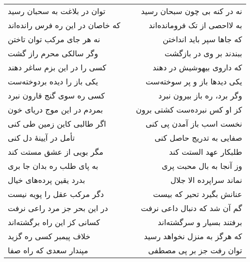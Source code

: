 \begin{center}
\begin{longtable}{l p{0.5cm} r}
\\
توان در بلاغت به سحبان رسید
&&
نه در کنه بی چون سبحان رسید
\\
که خاصان در این ره فرس رانده‌اند
&&
به لااحصی از تک فرومانده‌اند
\\
نه هر جای مرکب توان تاختن
&&
که جاها سپر باید انداختن
\\
وگر سالکی محرم راز گشت
&&
ببندند بر وی در بازگشت
\\
کسی را در این بزم ساغر دهند
&&
که داروی بیهوشیش در دهند
\\
یکی باز را دیده بردوخته‌ست
&&
یکی دیدها باز و پر سوخته‌ست
\\
کسی ره سوی گنج قارون نبرد
&&
وگر برد، ره باز بیرون نبرد
\\
بمردم در این موج دریای خون
&&
کز او کس نبرده‌ست کشتی برون
\\
اگر طالبی کاین زمین طی کنی
&&
نخست اسب باز آمدن پی کنی
\\
تأمل در آیینهٔ دل کنی
&&
صفایی به تدریج حاصل کنی
\\
مگر بویی از عشق مستت کند
&&
طلبکار عهد الستت کند
\\
به پای طلب ره بدان جا بری
&&
وز آنجا به بال محبت پری
\\
بدرد یقین پرده‌های خیال
&&
نماند سراپرده الا جلال
\\
دگر مرکب عقل را پویه نیست
&&
عنانش بگیرد تحیر که بیست
\\
در این بحر جز مرد راعی نرفت
&&
گم آن شد که دنبال داعی نرفت
\\
کسانی کز این راه برگشته‌اند
&&
برفتند بسیار و سرگشته‌اند
\\
خلاف پیمبر کسی ره گزید
&&
که هرگز به منزل نخواهد رسید
\\
مپندار سعدی که راه صفا
&&
توان رفت جز بر پی مصطفی
\\
\end{longtable}
\end{center}
